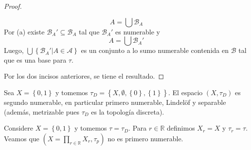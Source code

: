\documentclass[12pt]{report}
\theoremstyle{largebreak}
\begin{document}
\begin{proof}
\begin{enumerate}
\begin{equation*}
                A=\bigcup\mathcal{B}_A
            \end{equation*}
            Por (a) existe $\mathcal{B}_A'\subseteq\mathcal{B}_A$ tal que $\mathcal{B}_A'$ es numerable y
            \begin{equation*}
                A=\bigcup\mathcal{B}_A'
            \end{equation*}
            Luego, $\bigcup\left\{\mathcal{B}_A'\Big|A\in\mathcal{A} \right\}$ es un conjunto a lo sumo numerable contenida en $\mathcal{B}$ tal que es una base para $\tau$.
        \end{enumerate}
        Por los dos incisos anteriores, se tiene el resultado.
    \end{proof}

    \begin{exa}
        Sea $X=\left\{0,1\right\}$ y tomemos $\tau_D=\left\{X,\emptyset,\left\{0\right\},\left\{1\right\}\right\}$. El espacio $(X,\tau_D)$ es segundo numerable, en particular primero numerable, Lindelöf y separable (además, metrizable pues $\tau_D$ es la topología discreta).
    \end{exa}

    \begin{exa}
        Considere $X=\left\{0,1\right\}$ y tomemos $\tau=\tau_D$. Para $r\in\mathbb{R}$ definimos $X_r=X$ y $\tau_r=\tau$. Veamos que $\left(X=\prod_{ r\in\mathbb{R}}X_r,\tau_p \right)$ no es primero numerable.
    \end{exa}
\end{document}
